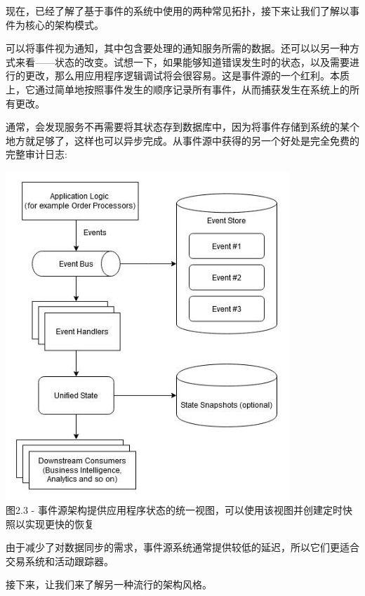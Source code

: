现在，已经了解了基于事件的系统中使用的两种常见拓扑，接下来让我们了解以事件为核心的架构模式。


可以将事件视为通知，其中包含要处理的通知服务所需的数据。还可以以另一种方式来看——状态的改变。试想一下，如果能够知道错误发生时的状态，以及需要进行的更改，那么用应用程序逻辑调试将会很容易。这是事件源的一个红利。本质上，它通过简单地按照事件发生的顺序记录所有事件，从而捕获发生在系统上的所有更改。

通常，会发现服务不再需要将其状态存到数据库中，因为将事件存储到系统的某个地方就足够了，这样也可以异步完成。从事件源中获得的另一个好处是完全免费的完整审计日志:

\begin{center}
\includegraphics[width=0.8\textwidth]{content/1/chapter2/images/3.jpg}\\
图2.3 - 事件源架构提供应用程序状态的统一视图，可以使用该视图并创建定时快照以实现更快的恢复
\end{center}

由于减少了对数据同步的需求，事件源系统通常提供较低的延迟，所以它们更适合交易系统和活动跟踪器。

接下来，让我们来了解另一种流行的架构风格。























